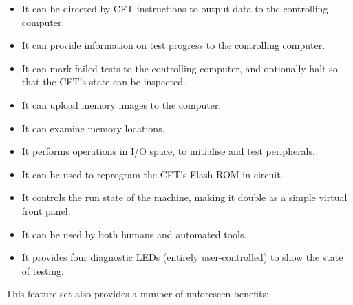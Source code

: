 \begin{itemize}
\item It can be directed by CFT instructions to output data to the
  controlling computer.
\item It can provide information on test progress to the controlling computer.
\item It can mark failed tests to the controlling computer, and optionally halt so that the CFT's state can be inspected.
\item It can upload memory images to the computer.
\item It can examine memory locations.
\item It performs operations in I/O space, to initialise and test peripherals.
\item It can be used to reprogram the CFT's Flash ROM in-circuit.
\item It controls the run state of the machine, making it double as a
  simple virtual front panel.
\item It can be used by both humans and automated tools.
\item It provides four diagnostic LEDs (entirely user-controlled) to
  show the state of testing.
\end{itemize}

This feature set also provides a number of unforeseen benefits:

